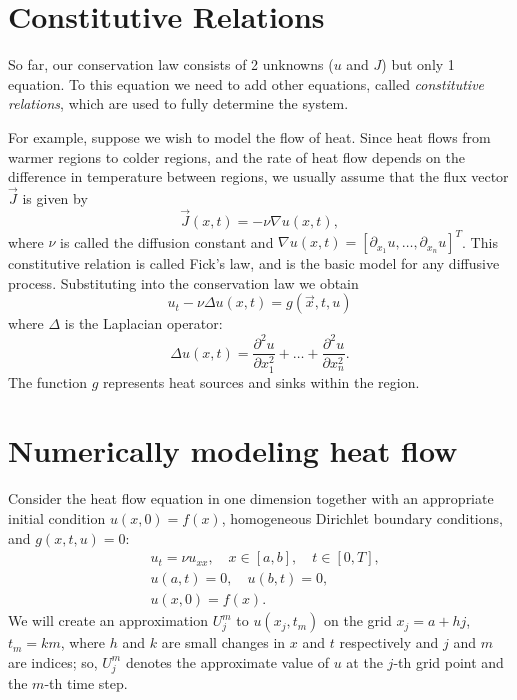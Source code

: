 \section*{Constitutive Relations}
So far, our conservation law consists of 2 unknowns ($u$ and $J$) but only 1 equation.
To this equation we need to add other equations, called \textit{constitutive relations}, which are used to fully determine the system.

For example, suppose we wish to model the flow of heat.
Since heat flows from warmer regions to colder regions, and the rate of heat flow depends on the difference in temperature between regions, we usually assume that the flux vector $\vec{J}$ is given by
\[\vec{J}(x,t) = -\nu \nabla u(x,t),\]
where $\nu$ is called the diffusion constant and $\nabla u(x,t) = \left[ \partial_{x_1}u, \dots, \partial_{x_n}u\right]^T$.
This constitutive relation is called Fick's law, and is the basic model for any diffusive process.
Substituting into the conservation law we obtain
\[u_t -\nu \Delta u(x,t) = g(\vec{x},t,u)\]
where $\Delta$ is the Laplacian operator:
\[\Delta u(x,t) = \frac{\partial ^2 u}{\partial x_1^2}+\dots+ \frac{\partial ^2 u}{\partial x_n^2}.\]
The function $g$ represents heat sources and sinks within the region.

\section*{Numerically modeling heat flow}
Consider the heat flow equation in one dimension together with an appropriate initial condition \(u(x,0)=f(x)\), homogeneous Dirichlet boundary conditions, and \(g(x,t,u)=0\):
\begin{align*}
	&{ } u_t = \nu u_{xx}, \quad x \in [a,b],\quad t \in [0,T], \\
	&{ } u(a,t) = 0,\quad u(b,t) = 0,\\
	&{ } u(x,0) = f(x).
\end{align*}
We will create an approximation $U^m_j$ to $u(x_j,t_m)$ on the grid $x_j = a +  hj$, $t_m = km$, where $h$ and $k$ are small changes in $x$ and $t$ respectively and $j$ and $m$ are indices; so, \(U_j^m\) denotes the approximate value of $u$ at the $j$-th grid point and the $m$-th time step.


